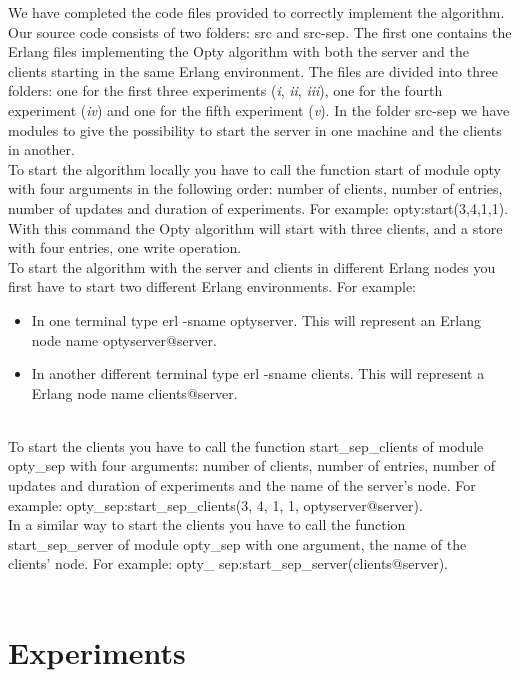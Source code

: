 \documentclass[a4paper, 11pt]{article}
\begin{document}
We have completed the code files provided to correctly implement the algorithm. Our source code consists of two folders: src and src-sep. The first one contains the Erlang files implementing the Opty algorithm with both the server and the clients starting in the same Erlang environment. The files are divided into three folders: one for the first three experiments (\textit{i}, \textit{ii}, \textit{iii}), one for the fourth experiment (\textit{iv}) and one for the fifth experiment (\textit{v}). In the folder src-sep we have modules to give the possibility to start the server in one machine and the clients in another.\\
To start the algorithm locally you have to call the function start of module opty with four arguments in the following order: number of clients, number of entries, number of updates and duration of experiments. For example: opty:start(3,4,1,1). With this command the Opty algorithm will start with three clients, and a store with four entries, one write operation. \\
To start the algorithm with the server and clients in different Erlang nodes you first have to start two different Erlang environments. For example:
\begin{itemize}
\item In one terminal type erl -sname optyserver. This will represent an Erlang node name optyserver@server.\\
\item In another different terminal type erl -sname clients. This will represent a Erlang node name clients@server.\\
\end{itemize}\\
%
To start the clients you have to call the function start\_sep\_clients of module opty\_sep with four arguments: number of clients, number of entries, number of updates and duration of experiments and the name of the server’s node. For example: opty\_sep:start\_sep\_clients(3, 4, 1, 1, optyserver@server).\\
In a similar way to start the clients you have to call the function start\_sep\_server of module opty\_sep with one argument, the name of the clients' node. For example: opty\_ sep:start\_sep\_server(clients@server).\\\\

\section{Experiments}
\end{document}
